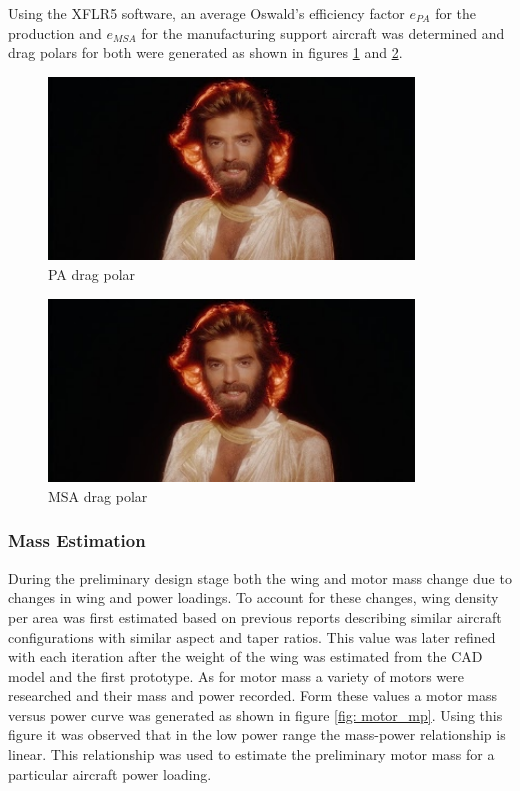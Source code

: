 


Using the XFLR5 software, an average Oswald’s efficiency factor $e_{PA}$ for the production and $e_{MSA}$ for the manufacturing support aircraft was determined and drag polars for both were generated as shown in figures \ref{fig:pa_drag_polar} and \ref{fig:msa_drag_polar}.

\begin{figure}[H]
    \centering
    \includegraphics[width=9.72cm]{./preliminary_design/fig/dummy}
    \caption{PA drag polar}
    \label{fig:pa_drag_polar}
\end{figure}

\begin{figure}[H]
    \centering
    \includegraphics[width=9.72cm]{./preliminary_design/fig/dummy}
    \caption{MSA drag polar}
    \label{fig:msa_drag_polar}
\end{figure}

\subsubsection{Mass Estimation}
During the preliminary design stage both the wing and motor mass change due to changes in wing and power loadings. To account for these changes, wing density per area was first estimated based on previous reports describing similar aircraft configurations with similar aspect and taper ratios. This value was later refined with each iteration after the weight of the wing was estimated from the CAD model and the first prototype. As for motor mass a variety of motors were researched and their mass and power recorded. Form these values a motor mass versus power curve was generated as shown in figure \ref{fig: motor_mp}. Using this figure it was observed that in the low power range the mass-power relationship is linear. This relationship was used to estimate the preliminary motor mass for a particular aircraft power loading.

